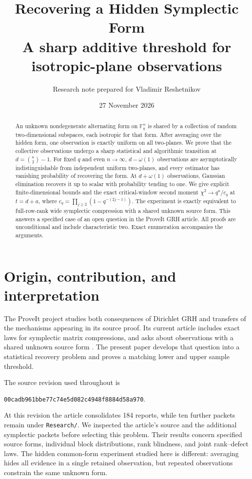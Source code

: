 \documentclass[11pt,a4paper]{article}
\title{\textbf{Recovering a Hidden Symplectic Form}\\[5pt]
\large A sharp additive threshold for isotropic-plane observations}
\author{Research note prepared for Vladimir Reshetnikov}
\date{27 November 2026}
\theoremstyle{remark}
\begin{document}
\maketitle
\begin{abstract}
An unknown nondegenerate alternating form on $\mathbb F_q^n$ is shared by a collection of random two-dimensional subspaces, each isotropic for that form. After averaging over the hidden form, one observation is exactly uniform on all two-planes. We prove that the collective observations undergo a sharp statistical and algorithmic transition at $d=\binom n2-1$. For fixed $q$ and even $n\to\infty$, $d-\omega(1)$ observations are asymptotically indistinguishable from independent uniform two-planes, and every estimator has vanishing probability of recovering the form. At $d+\omega(1)$ observations, Gaussian elimination recovers it up to scalar with probability tending to one. We give explicit finite-dimensional bounds and the exact critical-window second moment $\chi^2\to q^a/c_q$ at $t=d+a$, where $c_q=\prod_{j\ge2}(1-q^{-(2j-1)})$. The experiment is exactly equivalent to full-row-rank wide symplectic compression with a shared unknown source form. This answers a specified case of an open question in the ProveIt GRH article. All proofs are unconditional and include characteristic two. Exact enumeration accompanies the arguments.
\end{abstract}
\tableofcontents
\newpage

\section{Origin, contribution, and interpretation}

The ProveIt project studies both consequences of Dirichlet GRH and transfers of the mechanisms appearing in its source proof. Its current article includes exact laws for symplectic matrix compressions, and asks about observations with a shared unknown source form \cite[\texttt{spn:q:symplectic}]{proveit}. The present paper develops that question into a statistical recovery problem and proves a matching lower and upper sample threshold.

The source revision used throughout is
\begin{center}\small
\nolinkurl{00cadb961bbe77c74e5d082c4948f8884d58a970}.
\end{center}
At this revision the article consolidates 184 reports, while ten further packets remain under \texttt{Research/}. We inspected the article's source and the additional symplectic packets before selecting this problem. Their results concern specified source forms, individual block distributions, rank blindness, and joint rank--defect laws. The hidden common-form experiment studied here is different: averaging hides all evidence in a single retained observation, but repeated observations constrain the same unknown form.
\end{document}
